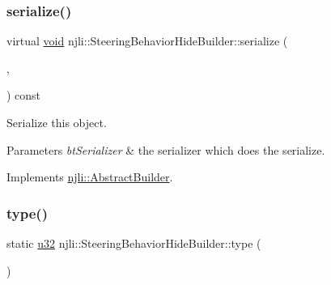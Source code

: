 \mbox{\label{classnjli_1_1_steering_behavior_hide_builder_aa58fb1f83e305f23906e6cadb9e7b31d}} 
\subsubsection{\texorpdfstring{serialize()}{serialize()}}
{\footnotesize\ttfamily virtual \mbox{\hyperlink{_thread_8h_af1e856da2e658414cb2456cb6f7ebc66}{void}} njli\+::\+Steering\+Behavior\+Hide\+Builder\+::serialize (\begin{DoxyParamCaption}\item[{\mbox{\hyperlink{_thread_8h_af1e856da2e658414cb2456cb6f7ebc66}{void}} $\ast$}]{,  }\item[{bt\+Serializer $\ast$}]{ }\end{DoxyParamCaption}) const\hspace{0.3cm}{\ttfamily [virtual]}}

Serialize this object.


\begin{DoxyParams}{Parameters}
{\em bt\+Serializer} & the serializer which does the serialize. \\
\hline
\end{DoxyParams}


Implements \mbox{\hyperlink{classnjli_1_1_abstract_builder_ab66b774e02ccb9da554c9aab7fa6d981}{njli\+::\+Abstract\+Builder}}.

\mbox{\label{classnjli_1_1_steering_behavior_hide_builder_a38a9fc01053815da006adef42faec3f4}} 
\subsubsection{\texorpdfstring{type()}{type()}}
{\footnotesize\ttfamily static \mbox{\hyperlink{_util_8h_a10e94b422ef0c20dcdec20d31a1f5049}{u32}} njli\+::\+Steering\+Behavior\+Hide\+Builder\+::type (\begin{DoxyParamCaption}{ }\end{DoxyParamCaption})\hspace{0.3cm}{\ttfamily [static]}}

